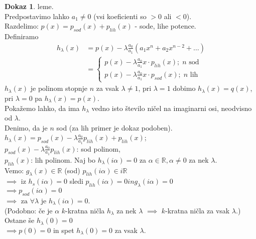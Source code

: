 \documentclass[a4paper, 12pt]{book}
\theoremstyle{definition}
\newtheorem{pro}[counter]{Dokaz}
\theoremstyle{remark}
\newcommand{\R}{\mathbb{R}}
\begin{document}
\begin{pro} leme. \\
    Predpostavimo lahko $a_1 \neq 0$ (vsi koeficienti so $> 0$ ali $< 0$). \\
    Razdelimo: $p(x) = p_{sod}(x) + p_{lih}(x)$ - sode, lihe potence. \\
    Definiramo
    \begin{align*}
    h_{\lambda}(x) &= p(x) - \lambda \frac{a_0}{a_1} \left(a_1 x^n + a_2 x^{n-2} + \dots \right) \\
    &= \begin{cases}
        p(x) - \lambda \frac{a_0}{a_1} x \cdot p_{lih}(x); \; n \text{ sod} \\
        p(x) - \lambda \frac{a_0}{a_1} x \cdot p_{sod}(x); \; n \text{ lih}
    \end{cases}
    \end{align*}
    $h_{\lambda}(x)$ je polinom stopnje $n$ za vsak $\lambda \neq 1$, pri $\lambda = 1$
    dobimo $h_{\lambda}(x) = q(x)$, pri $\lambda = 0$ pa $h_{\lambda}(x) = p(x)$. \\
    Pokažemo lahko, da ima $h_{\lambda}$ vedno isto število ničel na imaginarni osi,
    neodvisno od $\lambda$. \\
    Denimo, da je $n$ sod (za lih primer je dokaz podoben). \\
    $h_{\lambda}(x) = p_{sod}(x) - \lambda \frac{a_0}{a_1} p_{lih}(x) + p_{lih}(x)$; \\
    $p_{sod}(x) - \lambda \frac{a_0}{a_1} p_{lih}(x)$: sod polinom, \\
    $p_{lih}(x)$: lih polinom.
    Naj bo $h_{\lambda}(i \alpha) = 0$ za $\alpha \in \R, \alpha \neq 0$ za nek $\lambda$. \\
    Vemo: $g_{\lambda}(x) \in \R$ (sod)  $p_{lih}(i \alpha) \in i \R$ \\
    $\implies$ iz $h_s(i \alpha) = 0$ sledi $p_{lih}(i \alpha) = 0 in g_{\lambda}(i \alpha) = 0$ \\
    $\implies p_{sod}(i \alpha) = 0$ \\
    $\implies \text{ za } \forall \lambda \text{ je } h_{\lambda}(i \alpha) = 0$. \\
    (Podobno: če je $\alpha$ $k$-kratna ničla $h_{\lambda}$ za nek $\lambda$
    $\implies$ $k$-kratna ničla za vsak $\lambda$.) \\
    Ostane še $h_{\lambda}(0) = 0$ \\
    $\implies p(0) = 0$ in spet $h_{\lambda}(0) = 0$ za vsak $\lambda$.
\end{pro}
\end{document}
